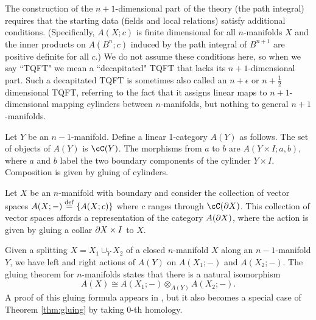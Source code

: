 The construction of the $n{+}1$-dimensional part of the theory (the path integral) 
requires that the starting data (fields and local relations) satisfy additional
conditions.
(Specifically, $A(X; c)$ is finite dimensional for all $n$-manifolds $X$ and the inner products
on $A(B^n; c)$ induced by the path integral of $B^{n+1}$ are positive definite for all $c$.)
We do not assume these conditions here, so when we say ``TQFT" we mean a ``decapitated" TQFT
that lacks its $n{+}1$-dimensional part. 
Such a decapitated TQFT is sometimes also called an $n{+}\epsilon$ or 
$n{+}\frac{1}{2}$ dimensional TQFT, referring to the fact that it assigns linear maps to $n{+}1$-dimensional
mapping cylinders between $n$-manifolds, but nothing to general $n{+}1$-manifolds.

Let $Y$ be an $n{-}1$-manifold.
Define a linear 1-category $A(Y)$ as follows.
The set of objects of $A(Y)$ is $\cC(Y)$.
The morphisms from $a$ to $b$ are $A(Y\times I; a, b)$, 
where $a$ and $b$ label the two boundary components of the cylinder $Y\times I$.
Composition is given by gluing of cylinders.

Let $X$ be an $n$-manifold with boundary and consider the collection of vector spaces
$A(X; -) \stackrel{\mathrm{def}}{=} \{A(X; c)\}$ where $c$ ranges through $\cC(\bd X)$.
This collection of vector spaces affords a representation of the category $A(\partial X)$, where
the action is given by gluing a collar $\partial X\times I$ to $X$.

Given a splitting $X = X_1 \cup_Y X_2$ of a closed $n$-manifold $X$ along an $n{-}1$-manifold $Y$,
we have left and right actions of $A(Y)$ on $A(X_1; -)$ and $A(X_2; -)$.
The gluing theorem for $n$-manifolds states that there is a natural isomorphism
\[
	A(X) \cong A(X_1; -) \otimes_{A(Y)} A(X_2; -) .
\]
A proof of this gluing formula appears in \cite{kw:tqft}, but it also becomes a 
special case of Theorem \ref{thm:gluing} by taking $0$-th homology.
